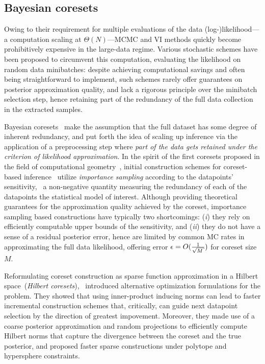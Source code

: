 \subsection{Bayesian coresets}
\label{subsec:b-coresets}
Owing to their requirement for multiple evaluations of the data (log-)likelihood---a computation scaling at $\Theta(N)$---MCMC and VI methods quickly become prohibitively expensive in the large-data regime. Various stochastic schemes have been proposed to circumvent this computation, evaluating the likelihood on random data minibatches: despite achieving computational savings and often being straightforward to implement, such schemes rarely offer guarantees on posterior approximation quality, and lack a rigorous principle over the minibatch selection step, hence retaining part of the redundancy of the full data collection in the extracted samples.

Bayesian coresets~\citep{huggins16,campbell18,campbell19jmlr,campbell19neurips,zhang21} make the assumption that the full dataset has some degree of inherent redundancy, and put forth the idea of scaling up inference via the application of a preprocessing step where \emph{part of the data gets retained under the criterion of likelihood approximation}. In the spirit of the first coresets proposed in the field of computational geometry~\citep{feldman11unified}, initial construction schemes for coreset-based \mbox{inference~\citep{huggins16,lucic17training}} utilize \emph{importance sampling} according to the datapoints' sensitivity, \ie~a non-negative quantity measuring the redundancy of each of the datapoints \wrt the statistical model of interest. Although providing theoretical guarantees for the approximation quality achieved by the coreset, importance sampling based constructions have typically two shortcomings: (\emph{i}) they rely on efficiently computable upper bounds of the sensitivity, and (\emph{ii}) they do not have a sense of a residual posterior error, hence are limited by common MC rates in approximating the full data likelihood, offering error $\eps = O(\frac{1}{\sqrt{M}})$ for coreset size $M$.

Reformulating coreset construction as sparse function approximation in a Hilbert space~(\emph{Hilbert coresets}),~ introduced alternative optimization formulations for the problem. They showed that using inner-product inducing norms can lead to faster incremental construction schemes that, critically, can guide next datapoint selection by the direction of greatest impovement. Moreover, they made use of a coarse posterior approximation and random projections to efficiently compute Hilbert norms that capture the divergence between the coreset and the true posterior, and proposed faster sparse constructions under polytope and hypersphere constraints.

